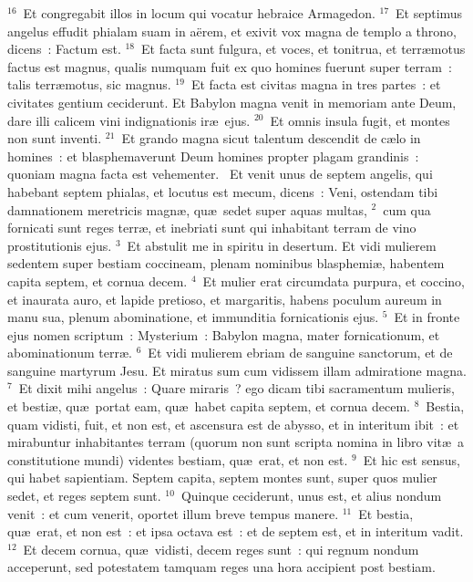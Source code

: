 ${}^{16}$~Et congregabit illos in locum qui vocatur hebraice Armagedon.
${}^{17}$~Et septimus angelus effudit phialam suam in a\"erem, et exivit vox magna de templo a throno, dicens~: Factum est.
${}^{18}$~Et facta sunt fulgura, et voces, et tonitrua, et terr\ae motus factus est magnus, qualis numquam fuit ex quo homines fuerunt super terram~: talis terr\ae motus, sic magnus.
${}^{19}$~Et facta est civitas magna in tres partes~: et civitates gentium ceciderunt. Et Babylon magna venit in memoriam ante Deum, dare illi calicem vini indignationis ir\ae\ ejus.
${}^{20}$~Et omnis insula fugit, et montes non sunt inventi.
${}^{21}$~Et grando magna sicut talentum descendit de c\ae lo in homines~: et blasphemaverunt Deum homines propter plagam grandinis~: quoniam magna facta est vehementer.
~\lettrine[lines=10,image=true,loversize=0.05,lraise=-0.03]{E}{}t venit unus de septem angelis, qui habebant septem phialas, et locutus est mecum, dicens~: Veni, ostendam tibi damnationem meretricis magn\ae , qu\ae\ sedet super aquas multas,
${}^{2}$~cum qua fornicati sunt reges terr\ae , et inebriati sunt qui inhabitant terram de vino prostitutionis ejus.
${}^{3}$~Et abstulit me in spiritu in desertum. Et vidi mulierem sedentem super bestiam coccineam, plenam nominibus blasphemi\ae , habentem capita septem, et cornua decem.
${}^{4}$~Et mulier erat circumdata purpura, et coccino, et inaurata auro, et lapide pretioso, et margaritis, habens poculum aureum in manu sua, plenum abominatione, et immunditia fornicationis ejus.
${}^{5}$~Et in fronte ejus nomen scriptum~: Mysterium~: Babylon magna, mater fornicationum, et abominationum terr\ae .
${}^{6}$~Et vidi mulierem ebriam de sanguine sanctorum, et de sanguine martyrum Jesu. Et miratus sum cum vidissem illam admiratione magna.
${}^{7}$~Et dixit mihi angelus~: Quare miraris~? ego dicam tibi sacramentum mulieris, et besti\ae , qu\ae\ portat eam, qu\ae\ habet capita septem, et cornua decem.
${}^{8}$~Bestia, quam vidisti, fuit, et non est, et ascensura est de abysso, et in interitum ibit~: et mirabuntur inhabitantes terram (quorum non sunt scripta nomina in libro vit\ae\ a constitutione mundi) videntes bestiam, qu\ae\ erat, et non est.
${}^{9}$~Et hic est sensus, qui habet sapientiam. Septem capita, septem montes sunt, super quos mulier sedet, et reges septem sunt.
${}^{10}$~Quinque ceciderunt, unus est, et alius nondum venit~: et cum venerit, oportet illum breve tempus manere.
${}^{11}$~Et bestia, qu\ae\ erat, et non est~: et ipsa octava est~: et de septem est, et in interitum vadit.
${}^{12}$~Et decem cornua, qu\ae\ vidisti, decem reges sunt~: qui regnum nondum acceperunt, sed potestatem tamquam reges una hora accipient post bestiam.
